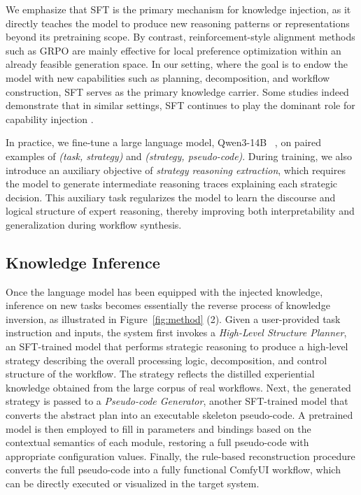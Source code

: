 \documentclass[runningheads]{llncs}
\begin{document}
We emphasize that SFT is the primary mechanism for knowledge injection, as it directly teaches the model to produce new reasoning patterns or representations beyond its pretraining scope.
%
By contrast, reinforcement-style alignment methods such as GRPO are mainly effective for local preference optimization within an already feasible generation space.
%
In our setting, where the goal is to endow the model with new capabilities such as planning, decomposition, and workflow construction, SFT serves as the primary knowledge carrier.
%
Some studies indeed demonstrate that in similar settings, SFT continues to play the dominant role for capability injection \cite{xu2025comfyuir1}.


In practice, we fine-tune a large language model, Qwen3-14B ~\cite{yang2025qwen3}, on paired examples of \textit{(task, strategy)} and \textit{(strategy, pseudo-code)}.
%
During training, we also introduce an auxiliary objective of \textit{strategy reasoning extraction}, which requires the model to generate intermediate reasoning traces explaining each strategic decision.
%
This auxiliary task regularizes the model to learn the discourse and logical structure of expert reasoning, thereby improving both interpretability and generalization during workflow synthesis.


\subsection{Knowledge Inference}
%
Once the language model has been equipped with the injected knowledge, inference on new tasks becomes essentially the reverse process of knowledge inversion, as illustrated in Figure~\ref{fig:method} (2).
%
Given a user-provided task instruction and inputs, the system first invokes a \textit{High-Level Structure Planner}, an SFT-trained model that performs strategic reasoning to produce a high-level strategy describing the overall processing logic, decomposition, and control structure of the workflow.
%
The strategy reflects the distilled experiential knowledge obtained from the large corpus of real workflows.
%
Next, the generated strategy is passed to a \textit{Pseudo-code Generator}, another SFT-trained model that converts the abstract plan into an executable skeleton pseudo-code.
%
A pretrained model is then employed to fill in parameters and bindings based on the contextual semantics of each module, restoring a full pseudo-code with appropriate configuration values.
%
Finally, the rule-based reconstruction procedure converts the full pseudo-code into a fully functional ComfyUI workflow, which can be directly executed or visualized in the target system.
\end{document}
